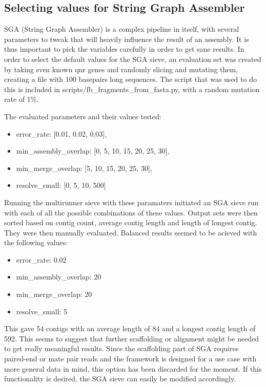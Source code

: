 \documentclass[a4paper,12pt]{article}
\begin{document}
\subsection{Selecting values for String Graph Assembler}
SGA (String Graph Assembler) is a complex pipeline in itself, with several parameters to tweak that will heavily influence the result of an assembly. It is thus important to pick the variables carefully in order to get sane results. In order to select the default values for the SGA sieve, an evaluation set was created by taking sven known qnr genes and randomly slicing and mutating them, creating a file with 100 basepairs long sequences. The script that was used to do this is included in scripts/fb\_fragments\_from\_fasta.py, with a random mutation rate of 1\%.

The evaluated parameters and their values tested:
\begin{itemize}
\item
error\_rate: [0.01, 0.02, 0.03],
\item
min\_assembly\_overlap: [0, 5, 10, 15, 20, 25, 30],
\item
min\_merge\_overlap: [5, 10, 15, 20, 25, 30],
\item
resolve\_small: [0, 5, 10, 500]
\end{itemize}

Running the multirunner sieve with these paramaters initiated an SGA sieve run with each of all the possible combinations of these values. Output sets were then sorted based on contig count, average contig length and length of longest contig. They were then manually evaluated. Balanced results seemed to be acieved with the following values:
\begin{itemize}
\item
error\_rate: 0.02
\item
min\_assembly\_overlap: 20
\item
min\_merge\_overlap: 20
\item
resolve\_small: 5
\end{itemize}
This gave 54 contigs with an average length of 84 and a longest contig length of 592. This seems to suggest that further scaffolding or alignment might be needed to get really meaningful results. Since the scaffolding part of SGA requires paired-end or mate pair reads and the framework is designed for a use case with more general data in mind, this option has been discarded for the moment. If this functionality is desired, the SGA sieve can easily be modified accordingly.
\end{document}
